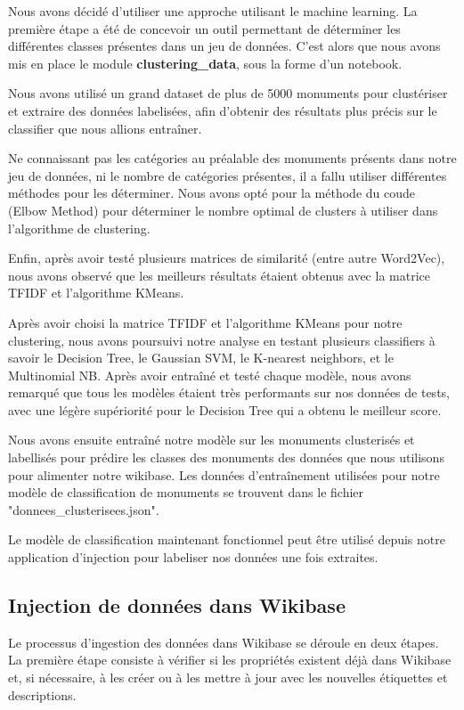 \documentclass[a4paper, 12pt]{article}
\begin{document}
Nous avons décidé d'utiliser une approche utilisant le machine learning. La première étape a été de concevoir un outil permettant de déterminer les différentes classes présentes dans un jeu de données. C'est alors que nous avons mis en place le module \textbf{clustering\_data}, sous la forme d'un notebook.

Nous avons utilisé un grand dataset de plus de 5000 monuments pour clustériser et extraire des données labelisées, afin d'obtenir des résultats plus précis sur le classifier que nous allions entraîner.

Ne connaissant pas les catégories au préalable des monuments présents dans notre jeu de données, ni le nombre de catégories présentes, il a fallu utiliser différentes méthodes pour les déterminer. Nous avons opté pour la méthode du coude (Elbow Method) pour déterminer le nombre optimal de clusters à utiliser dans l'algorithme de clustering.

Enfin, après avoir testé plusieurs matrices de similarité (entre autre Word2Vec), nous avons observé que les meilleurs résultats étaient obtenus avec la matrice TFIDF et l'algorithme KMeans.


Après avoir choisi la matrice TFIDF et l'algorithme KMeans pour notre clustering, nous avons poursuivi notre analyse en testant plusieurs classifiers à savoir le Decision Tree, le Gaussian SVM, le K-nearest neighbors, et le Multinomial NB. Après avoir entraîné et testé chaque modèle, nous avons remarqué que tous les modèles étaient très performants sur nos données de tests, avec une légère supériorité pour le Decision Tree qui a obtenu le meilleur score.

Nous avons ensuite entraîné notre modèle sur les monuments clusterisés et labellisés pour prédire les classes des monuments des données que nous utilisons pour alimenter notre wikibase. Les données d'entraînement utilisées pour notre modèle de classification de monuments se trouvent dans le fichier "donnees\_clusterisees.json".

Le modèle de classification maintenant fonctionnel peut être utilisé depuis notre application d'injection pour labeliser nos données une fois extraites.

\newpage
\subsection{Injection de données dans Wikibase}

Le processus d'ingestion des données dans Wikibase se déroule en deux étapes. La première étape consiste à vérifier si les propriétés existent déjà dans Wikibase et, si nécessaire, à les créer ou à les mettre à jour avec les nouvelles étiquettes et descriptions. 
\end{document}

